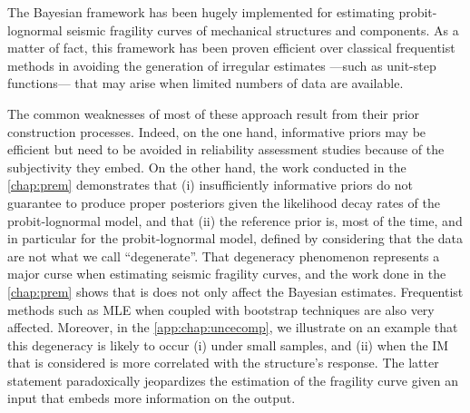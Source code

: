 

The Bayesian framework has been hugely implemented for estimating probit-lognormal seismic fragility curves of mechanical structures and components. %
As a matter of fact, this framework has been proven efficient over classical frequentist methods in avoiding the generation of irregular estimates ---such as unit-step functions--- that may arise when limited numbers of data are available.

The common 
weaknesses of most of these approach result from  %
their prior construction processes.  
Indeed, on the one hand, informative priors may be efficient but need to be 
avoided in reliability assessment studies because of the subjectivity they embed.
On the other hand, the work conducted in the \cref{chap:prem} demonstrates that (i) insufficiently informative priors do not guarantee to produce proper posteriors given the likelihood decay rates of the probit-lognormal model, and that (ii)  
the reference prior is, most of the time, and in particular for the probit-lognormal model, defined by considering that the data are not what we call ``degenerate''. %
%
That degeneracy phenomenon represents a major curse when estimating seismic fragility curves, and the work done in the \cref{chap:prem} shows that is does not only affect the Bayesian estimates. Frequentist methods such as MLE when coupled with bootstrap techniques are also very affected.
Moreover, in the \cref{app:chap:uncecomp}, we illustrate on an example that this degeneracy is likely to occur (i) under small samples, and (ii) when the IM that is considered is more correlated with the structure's response.
The latter statement paradoxically jeopardizes the estimation of the fragility curve given an input that embeds more information on the output. %










